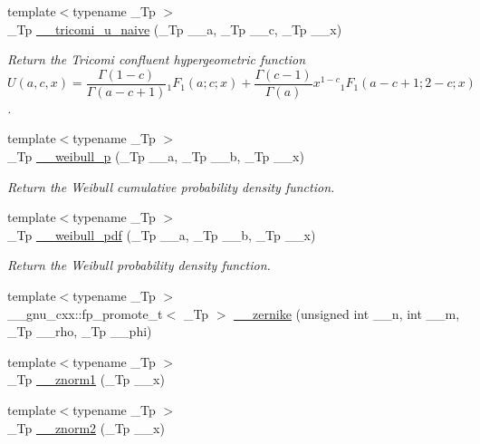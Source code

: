 \begin{DoxyCompactItemize}
{\footnotesize template$<$typename \+\_\+\+Tp $>$ }\\\+\_\+\+Tp \hyperlink{namespacestd_1_1____detail_adc131cec2eae93bacc28d6afd89def2f}{\+\_\+\+\_\+tricomi\+\_\+u\+\_\+naive} (\+\_\+\+Tp \+\_\+\+\_\+a, \+\_\+\+Tp \+\_\+\+\_\+c, \+\_\+\+Tp \+\_\+\+\_\+x)
\begin{DoxyCompactList}\small\item\em Return the Tricomi confluent hypergeometric function \[ U(a,c,x) = \frac{\Gamma(1-c)}{\Gamma(a-c+1)} {}_1F_1(a;c;x) + \frac{\Gamma(c-1)}{\Gamma(a)} x^{1-c} {}_1F_1(a-c+1;2-c;x) \]. \end{DoxyCompactList}\item 
{\footnotesize template$<$typename \+\_\+\+Tp $>$ }\\\+\_\+\+Tp \hyperlink{namespacestd_1_1____detail_a3a488f2c4057fb927c0e79263a311481}{\+\_\+\+\_\+weibull\+\_\+p} (\+\_\+\+Tp \+\_\+\+\_\+a, \+\_\+\+Tp \+\_\+\+\_\+b, \+\_\+\+Tp \+\_\+\+\_\+x)
\begin{DoxyCompactList}\small\item\em Return the Weibull cumulative probability density function. \end{DoxyCompactList}\item 
{\footnotesize template$<$typename \+\_\+\+Tp $>$ }\\\+\_\+\+Tp \hyperlink{namespacestd_1_1____detail_ab15a21521bc750303938a108c5a0bb0b}{\+\_\+\+\_\+weibull\+\_\+pdf} (\+\_\+\+Tp \+\_\+\+\_\+a, \+\_\+\+Tp \+\_\+\+\_\+b, \+\_\+\+Tp \+\_\+\+\_\+x)
\begin{DoxyCompactList}\small\item\em Return the Weibull probability density function. \end{DoxyCompactList}\item 
{\footnotesize template$<$typename \+\_\+\+Tp $>$ }\\\+\_\+\+\_\+gnu\+\_\+cxx\+::fp\+\_\+promote\+\_\+t$<$ \+\_\+\+Tp $>$ \hyperlink{namespacestd_1_1____detail_afea4164e87d4290c59c0f8b52113b946}{\+\_\+\+\_\+zernike} (unsigned int \+\_\+\+\_\+n, int \+\_\+\+\_\+m, \+\_\+\+Tp \+\_\+\+\_\+rho, \+\_\+\+Tp \+\_\+\+\_\+phi)
\item 
{\footnotesize template$<$typename \+\_\+\+Tp $>$ }\\\+\_\+\+Tp \hyperlink{namespacestd_1_1____detail_a6827b123253cc6a19947406339738bd7}{\+\_\+\+\_\+znorm1} (\+\_\+\+Tp \+\_\+\+\_\+x)
\item 
{\footnotesize template$<$typename \+\_\+\+Tp $>$ }\\\+\_\+\+Tp \hyperlink{namespacestd_1_1____detail_adf930b70ca943c6810ac7d2ea78d2cc3}{\+\_\+\+\_\+znorm2} (\+\_\+\+Tp \+\_\+\+\_\+x)
\end{DoxyCompactItemize}
